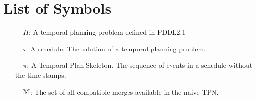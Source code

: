 \section*{\Huge List of Symbols}
\begin{itemize}
    \item[$-$] $\Pi$: A temporal planning problem defined in PDDL2.1
    \item[$-$] $\tau$: A schedule. The solution of a temporal planning problem. 
    \item[$-$] $\pi$: A Temporal Plan Skeleton. The sequence of events in a schedule without the time stamps.
    \item[$-$] $\mathbb{M}$: The set of all compatible merges available in the naive TPN.  
\end{itemize}

